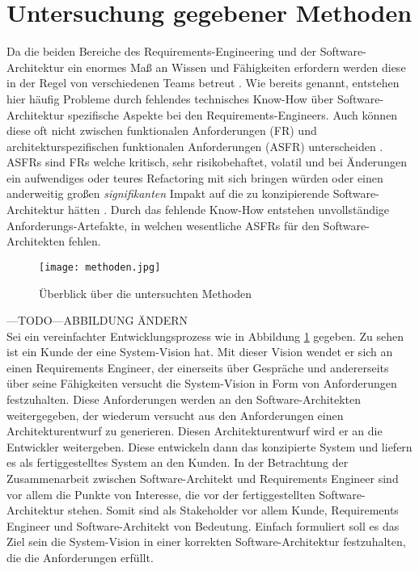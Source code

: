 \section{Untersuchung gegebener Methoden}\label{unters}
Da die beiden Bereiche des Requirements-Engineering und der Software-Architektur ein enormes Ma\ss{} an Wissen und F\"ahigkeiten erfordern werden diese in der Regel von verschiedenen Teams betreut \cite{Ros02}. Wie bereits genannt, entstehen hier h\"aufig Probleme durch fehlendes technisches Know-How \"uber Software-Architektur spezifische Aspekte bei den Requirements-Engineers. Auch k\"onnen diese oft nicht zwischen funktionalen Anforderungen (FR) und architekturspezifischen funktionalen Anforderungen (ASFR) unterscheiden \cite{Ros03}. ASFRs sind FRs welche kritisch, sehr risikobehaftet, volatil und bei \"Anderungen ein aufwendiges oder teures Refactoring mit sich bringen w\"urden oder einen anderweitig gro\ss{}en \textit{signifikanten} Impakt auf die zu konzipierende Software-Architektur h\"atten \cite{Ros02}. Durch das fehlende Know-How entstehen unvollst\"andige Anforderungs-Artefakte, in welchen wesentliche ASFRs f\"ur den Software-Architekten fehlen. \\

\begin{figure}[h]
	\centering
	\texttt{[image: methoden.jpg]} 
	\caption{\"Uberblick \"uber die untersuchten Methoden}\label{methoden}
\end{figure}

---TODO---ABBILDUNG ÄNDERN\\

Sei ein vereinfachter Entwicklungsprozess wie in Abbildung \ref{methoden} gegeben. Zu sehen ist ein Kunde der eine System-Vision hat. Mit dieser Vision wendet er sich an einen Requirements Engineer, der einerseits \"uber Gespr\"ache und andererseits \"uber seine F\"ahigkeiten versucht die System-Vision in Form von Anforderungen festzuhalten. Diese Anforderungen werden an den Software-Architekten weitergegeben, der wiederum versucht aus den Anforderungen einen Architekturentwurf zu generieren. Diesen Architekturentwurf wird er an die Entwickler weitergeben. Diese entwickeln dann das konzipierte System und liefern es als fertiggestelltes System an den Kunden. In der Betrachtung der Zusammenarbeit zwischen Software-Architekt und Requirements Engineer sind vor allem die Punkte von Interesse, die vor der fertiggestellten Software-Architektur stehen. Somit sind als Stakeholder vor allem Kunde, Requirements Engineer und Software-Architekt von Bedeutung. Einfach formuliert soll es das Ziel sein die System-Vision in einer korrekten Software-Architektur festzuhalten, die die Anforderungen erfüllt.\\


